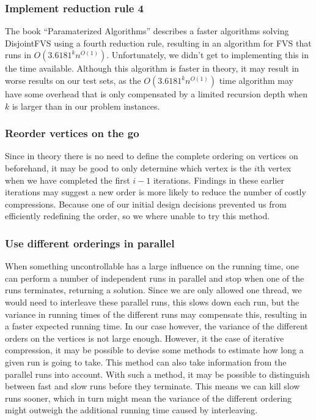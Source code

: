 \subsubsection{Implement reduction rule 4}
The book ``Paramaterized Algorithms'' \cite{ftpbook} describes a faster algorithms solving {\sc DisjointFVS} using a
fourth reduction rule, resulting in an algorithm for FVS that runs in $O(3.6181^kn^{O(1)})$. Unfortunately, we didn't
get to implementing this in the time available. Although this algorithm is faster in theory, it may result in worse results on our test sets, as the $O(3.6181^kn^{O(1)})$ time algorithm may have some overhead that is only compensated by a limited recursion depth when $k$ is larger than in our problem instances.

\subsubsection{Reorder vertices on the go}
Since in theory there is no need to define
the complete ordering on vertices on beforehand, it may be good to only determine which vertex is the $i$th vertex when
we have completed the first $i-1$ iterations. Findings in these earlier iterations may suggest a new order is more
likely to reduce the number of costly compressions. Because one of our initial design decisions prevented us from
efficiently redefining the order, so we where unable to try this method.

\subsubsection{Use different orderings in parallel}
When something uncontrollable has a large influence on the running
time, one can perform a number of independent runs in parallel and stop when one of the runs terminates, returning a
solution. Since we are only allowed one thread, we would need to interleave these parallel runs, this slows down each
run, but the variance in running times of the different runs may compensate this, resulting in a faster expected running
time. In our case however, the variance of the different orders on the vertices is not large enough. However, it the
case of iterative compression, it may be possible to devise some methods to estimate how long a given run is going to
take. This method can also take information from the parallel runs into account. With such a method, it may be possible
to distinguish between fast and slow runs before they terminate. This means we can kill slow runs sooner, which in turn
might mean the variance of the different ordering might outweigh the additional running time caused by interleaving.

